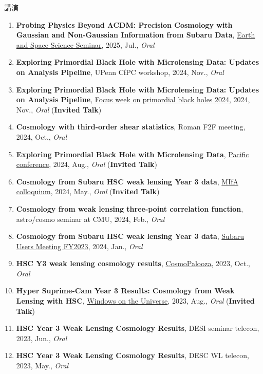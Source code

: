 \begin{rSection}{講演}
\begin{enumerate}
\item \textbf{Probing Physics Beyond ΛCDM: Precision Cosmology with Gaussian and Non-Gaussian Information from Subaru Data}, \href{https://www.ess.sci.osaka-u.ac.jp/researchers/seminar.html}{Earth and Space Science Seminar}, 2025, Jul., \textit{Oral}
\item \textbf{Exploring Primordial Black Hole with Microlensing Data: Updates on Analysis Pipeline}, UPenn CfPC workshop, 2024, Nov., \textit{Oral}
\item \textbf{Exploring Primordial Black Hole with Microlensing Data: Updates on Analysis Pipeline}, \href{https://indico.ipmu.jp/event/439/overview}{Focus week on primordial black holes 2024}, 2024, Nov., \textit{Oral} (\textbf{Invited Talk})
\item \textbf{Cosmology with third-order shear statistics}, Roman F2F meeting, 2024, Oct., \textit{Oral}
\item \textbf{Exploring Primordial Black Hole with Microlensing Data}, \href{https://pacific-conference.pa.ucla.edu/index.html}{Pacific conference}, 2024, Aug., \textit{Oral} (\textbf{Invited Talk})
\item \textbf{Cosmology from Subaru HSC weak lensing Year 3 data}, \href{https://cse.umn.edu/physics/minnesota-institute-astrophysics-mifa-colloquium}{MIfA colloquium}, 2024, May., \textit{Oral} (\textbf{Invited Talk})
\item \textbf{Cosmology from weak lensing three-point correlation function}, astro/cosmo seminar at CMU, 2024, Feb., \textit{Oral}
\item \textbf{Cosmology from Subaru HSC weak lensing Year 3 data}, \href{https://www.subarutelescope.org/Science/SubaruUM/SubaruUM2023/index.html}{Subaru Users Meeting FY2023}, 2024, Jan., \textit{Oral}
\item \textbf{HSC Y3 weak lensing cosmology results}, \href{http://vietnam.in2p3.fr/2023/windows/index.html}{CosmoPalooza}, 2023, Oct., \textit{Oral}
\item \textbf{Hyper Suprime-Cam Year 3 Results: Cosmology from Weak Lensing with HSC}, \href{http://vietnam.in2p3.fr/2023/windows/index.html}{Windows on the Universe}, 2023, Aug., \textit{Oral} (\textbf{Invited Talk})
\item \textbf{HSC Year 3 Weak Lensing Cosmology Results}, DESI seminar telecon, 2023, Jun., \textit{Oral}
\item \textbf{HSC Year 3 Weak Lensing Cosmology Results}, DESC WL telecon, 2023, May., \textit{Oral}

\end{enumerate}
\end{rSection}
